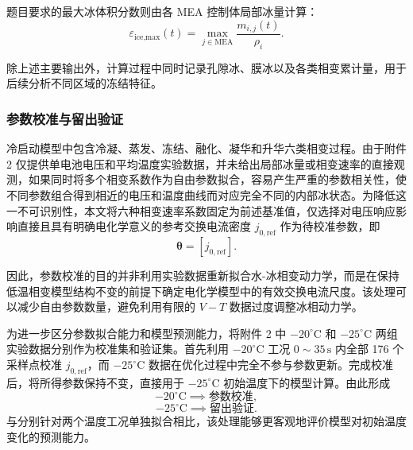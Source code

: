 \documentclass[bwprint]{gmcmthesis}
\numberwithin{figure}{section}
\begin{document}
 题目要求的最大冰体积分数则由各 MEA 控制体局部冰量计算：
\begin{equation}
\varepsilon_{\text{ice,max}}(t) = \max_{j \in \text{MEA}} \frac{m_{i,j}(t)}{\rho_i}. \tag{4-93}
\end{equation}

除上述主要输出外，计算过程中同时记录孔隙冰、膜冰以及各类相变累计量，用于后续分析不同区域的冻结特征。

\subsubsection{参数校准与留出验证}

冷启动模型中包含冷凝、蒸发、冻结、融化、凝华和升华六类相变过程。由于附件 2 仅提供单电池电压和平均温度实验数据，并未给出局部冰量或相变速率的直接观测，如果同时将多个相变系数作为自由参数拟合，容易产生严重的参数相关性，使不同参数组合得到相近的电压和温度曲线而对应完全不同的内部冰状态。为降低这一不可识别性，本文将六种相变速率系数固定为前述基准值，仅选择对电压响应影响直接且具有明确电化学意义的参考交换电流密度 \(j_{0,\text{ref}}\) 作为待校准参数，即
\begin{equation}
\boldsymbol{\theta} = [j_{0,\text{ref}}]. \tag{4-94}
\end{equation}

因此，参数校准的目的并非利用实验数据重新拟合水-冰相变动力学，而是在保持低温相变模型结构不变的前提下确定电化学模型中的有效交换电流尺度。该处理可以减少自由参数数量，避免利用有限的 \(V-T\) 数据过度调整冰相动力学。

为进一步区分参数拟合能力和模型预测能力，将附件 2 中 \(-20^\circ\text{C}\) 和 \(-25^\circ\text{C}\) 两组实验数据分别作为校准集和验证集。首先利用 \(-20^\circ\text{C}\) 工况 \(0 \sim 35 \, \text{s}\) 内全部 176 个采样点校准 \(j_{0,\text{ref}}\)，而 \(-25^\circ\text{C}\) 数据在优化过程中完全不参与参数更新。完成校准后，将所得参数保持不变，直接用于 \(-25^\circ\text{C}\) 初始温度下的模型计算。由此形成
\[
-20^\circ\text{C} \implies \text{参数校准},
\]
\[
-25^\circ\text{C} \implies \text{留出验证}.
\]
与分别针对两个温度工况单独拟合相比，该处理能够更客观地评价模型对初始温度变化的预测能力。
\end{document}
